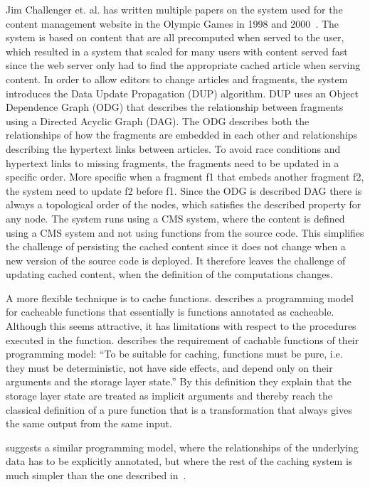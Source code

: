 Jim Challenger et. al. has written multiple papers on the system used for the content management website in the Olympic Games in 1998 and 2000~\cite{paper:ibm, paper:ibm-extended}. The system is based on content that are all precomputed when served to the user, which resulted in a system that scaled for many users with content served fast since the web server only had to find the appropriate cached article when serving content. In order to allow editors to change articles and fragments, the system introduces the Data Update Propagation (DUP) algorithm. DUP uses an Object Dependence Graph (ODG) that describes the relationship between fragments using a Directed Acyclic Graph (DAG). The ODG describes both the relationships of how the fragments are embedded in each other and relationships describing the hypertext links between articles. To avoid race conditions and hypertext links to missing fragments, the fragments need to be updated in a specific order. More specific when a fragment f1 that embeds another fragment f2, the system need to update f2 before f1. Since the ODG is described DAG there is always a topological order of the nodes, which satisfies the described property for any node. The system runs using a CMS system, where the content is defined using a CMS system and not using functions from the source code. This simplifies the challenge of persisting the cached content since it does not change when a new version of the source code is deployed. It therefore leaves the challenge of updating cached content, when the definition of the computations changes.


A more flexible technique is to cache functions. \cite{paper:liskov} describes a programming model for cacheable functions that essentially is functions annotated as cacheable. Although this seems attractive, it has limitations with respect to the procedures executed in the function. \cite{paper:liskov} describes the requirement of cachable functions of their programming model: “To be suitable for caching, functions must be pure, i.e. they must be deterministic, not have side effects, and depend only on their arguments and the storage layer state.” By this definition they explain that the storage layer state are treated as implicit arguments and thereby reach the classical definition of a pure function that is a transformation that always gives the same output from the same input.

\cite{paper:deploy-time} suggests a similar programming model, where the relationships of the underlying data has to be explicitly annotated, but where the rest of the caching system is much simpler than the one described in~\cite{paper:liskov}.

